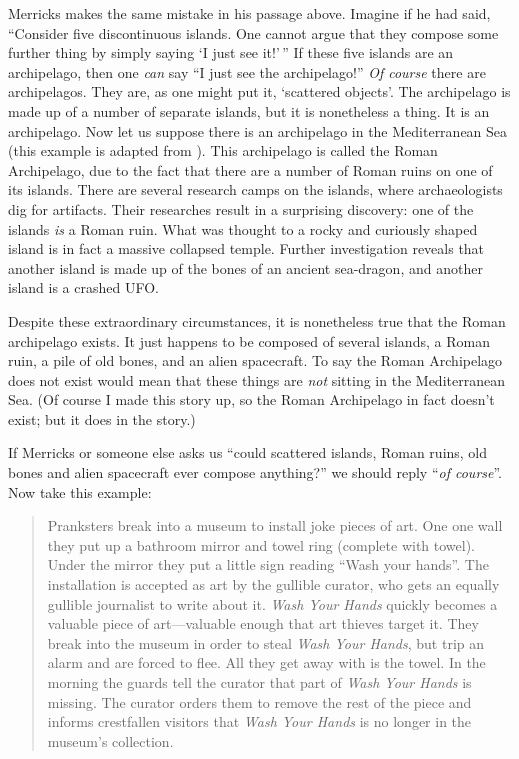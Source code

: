 \documentclass[11pt]{article}
\begin{document}
\begin{spacing}{1.25}
Merricks makes the same mistake in his passage above.  Imagine if he
had said, ``Consider five discontinuous islands.  One cannot argue
that they compose some further thing by simply saying `I just see
it!'\,'' If these five islands are an archipelago, then one {\em can}
say ``I just see the archipelago!''  {\em Of course} there are
archipelagos.  They are, as one might put it, `scattered objects'.
The archipelago is made up of a number of separate islands, but it is
nonetheless a thing.  It is an archipelago.  Now let us suppose there
is an archipelago in the Mediterranean Sea (this example is adapted
from \citet{hawthorne2008}).  This archipelago is called the Roman
Archipelago, due to the fact that there are a number of Roman ruins on
one of its islands.  There are several research camps on the islands,
where archaeologists dig for artifacts.  Their researches result in a
surprising discovery: one of the islands {\em is} a Roman ruin.  What
was thought to a rocky and curiously shaped island is in fact a
massive collapsed temple.  Further investigation reveals that another
island is made up of the bones of an ancient sea-dragon, and another
island is a crashed UFO.

Despite these extraordinary circumstances, it is nonetheless true that
the Roman archipelago exists.  It just happens to be composed of
several islands, a Roman ruin, a pile of old bones, and an alien
spacecraft.  To say the Roman Archipelago does not exist would mean
that these things are {\em not} sitting in the Mediterranean Sea.  (Of
course I made this story up, so the Roman Archipelago in fact doesn't
exist; but it does in the story.)

If Merricks or someone else asks us ``could scattered islands, Roman
ruins, old bones and alien spacecraft ever compose anything?'' we
should reply ``{\em of course}''.  Now take this example:

\begin{quote}
Pranksters break into a museum to install joke pieces of art.  One one
wall they put up a bathroom mirror and towel ring (complete with
towel).  Under the mirror they put a little sign reading ``Wash your
hands''.  The installation is accepted as art by the gullible curator,
who gets an equally gullible journalist to write about it.  {\em Wash
  Your Hands} quickly becomes a valuable piece of art---valuable
enough that art thieves target it.  They break into the museum in
order to steal {\em Wash Your Hands}, but trip an alarm and are forced
to flee.  All they get away with is the towel.  In the morning the
guards tell the curator that part of {\em Wash Your Hands} is missing.
The curator orders them to remove the rest of the piece and informs
crestfallen visitors that {\em Wash Your Hands} is no longer in the
museum's collection.
\end{quote}


\end{spacing}
\end{document}
